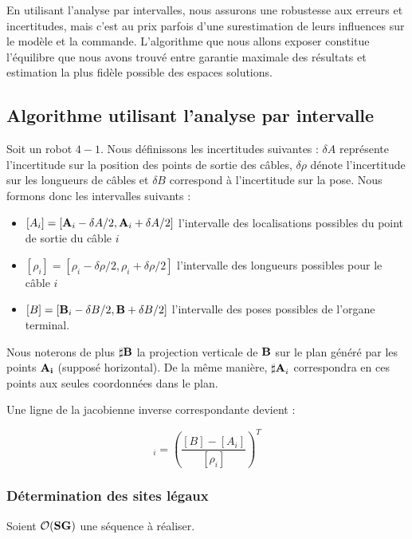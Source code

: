 En utilisant l'analyse par intervalles, nous assurons une robustesse aux 
erreurs et incertitudes, mais c'est au prix parfois d'une surestimation de 
leurs influences sur le mod\`ele et la commande. L'algorithme que nous allons 
exposer constitue l'\'equilibre que nous avons trouv\'e entre garantie maximale 
des r\'esultats et estimation la plus fid\`ele possible des espaces solutions.

\subsection{Algorithme utilisant l'analyse par intervalle}

Soit un robot $4-1$. Nous d\'efinissons les incertitudes suivantes : $\delta A$ 
repr\'esente l'incertitude sur la position des points de sortie des c\^ables, 
$\delta \rho$ d\'enote l'incertitude sur les longueurs de c\^ables et $\delta 
B$ correspond \`a l'incertitude sur la pose. Nous formons donc les intervalles 
suivants :
\begin{itemize}
 \item $[A_i] = [{\bf A}_i - \delta A/2,{\bf A}_i + \delta A/2]$ l'intervalle 
des localisations possibles du point de sortie du c\^able $i$
  \item $[\rho_i] = [\rho_i - \delta \rho /2,\rho_i + \delta \rho/2]$ 
l'intervalle des longueurs possibles pour le c\^able $i$
  \item $[B] = [{\bf B}_i - \delta B /2,{\bf B} + \delta B/2]$ l'intervalle 
des poses possibles de l'organe terminal.
\end{itemize}

Nous noterons de plus ${\bf \sharp B}$ la projection verticale de $\bf B$ sur 
le plan g\'en\'er\'e par les points ${\bf A_i}$ (suppos\'e horizontal). De la 
m\^eme mani\`ere, ${\bf \sharp A}_i$ correspondra en ces points aux seules 
coordonn\'ees dans le plan.

Une ligne de la jacobienne inverse correspondante devient :

\begin{equation}
[J^{-1}]_i = \left ( \frac {[B] - [A_i]}{[\rho_i]} \right )^T
\label{chap01:eq14}
\end{equation}

\subsubsection{D\'etermination des sites l\'egaux}

Soient $\mathcal O({\bf S}{\bf G})$ une s\'equence \`a r\'ealiser.

